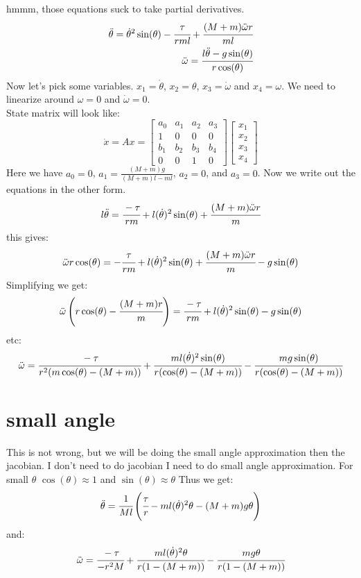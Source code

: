 \documentclass{article}
\begin{document}
hmmm, those equations suck to take partial derivatives.
\[\begin{split}\ddot{\theta}=\dot{\theta}^2\sin(\theta)-\cfrac{\tau}{rml}+\cfrac{(M+m)\ddot{\omega}r}{ml}\\\ddot{\omega}=\cfrac{l\ddot{\theta}-g\sin(\theta)}{r\cos(\theta)}\end{split}\]
Now let's pick some variables. $x_1=\dot{\theta}$, $x_2=\theta$, $x_3=\dot{\omega}$ and $x_4=\omega$. We need to linearize around $\omega=0$ and $\dot{\omega}=0$.\\
State matrix will look like:
\[\dot{x}=Ax=\begin{bmatrix}a_0&a_1&a_2&a_3\\1&0&0&0\\b_1&b_2&b_3&b_4\\0&0&1&0\end{bmatrix}\begin{bmatrix}x_1\\x_2\\x_3\\x_4\end{bmatrix}\]
Here we have $a_0=0$, $a_1=\frac{(M+m)g}{(M+m)l-ml}$, $a_2=0$, and $a_3=0$. Now we write out the equations in the other form.\\
\[l\ddot{\theta}=\cfrac{-\tau}{rm}+l(\dot{\theta})^2\sin(\theta)+\cfrac{(M+m)\ddot{\omega}r}{m}\]
this gives:
\[\ddot{\omega}r\cos(\theta)=-\cfrac{\tau}{rm}+l(\dot{\theta})^2\sin(\theta)+\cfrac{(M+m)\ddot{\omega}r}{m}-g\sin(\theta)\]
Simplifying we get:
\[\ddot{\omega}\left(r\cos(\theta)-\cfrac{(M+m)r}{m}\right )=\cfrac{-\tau}{rm}+l(\dot{\theta})^2\sin(\theta)-g\sin(\theta)\]
etc:
\[\ddot{\omega}=\cfrac{-\tau}{r^2(m\cos(\theta)-(M+m))}+\cfrac{ml(\dot{\theta})^2\sin(\theta)}{r(\cos(\theta)-(M+m))}-\cfrac{mg\sin(\theta)}{r(\cos(\theta)-(M+m))}\]
\section*{small angle}
This is not wrong, but we will be doing the small angle approximation then the jacobian. I don't need to do jacobian I need to do small angle approximation. For small $\theta$ $\cos(\theta)\approx 1$ and $\sin(\theta)\approx \theta$ Thus we get:
\[\ddot{\theta}=\cfrac{1}{Ml}\left (\cfrac{\tau}{r}-ml(\dot{\theta})^2\theta-(M+m)g\theta\right )\]
and:
\[\ddot{\omega}=\cfrac{-\tau}{-r^2M}+\cfrac{ml(\dot{\theta})^2\theta}{r(1-(M+m))}-\cfrac{mg\theta}{r(1-(M+m))}\]
\end{document}
